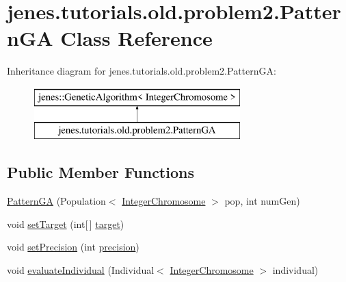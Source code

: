 \hypertarget{classjenes_1_1tutorials_1_1old_1_1problem2_1_1_pattern_g_a}{\section{jenes.\-tutorials.\-old.\-problem2.\-Pattern\-G\-A Class Reference}
\label{classjenes_1_1tutorials_1_1old_1_1problem2_1_1_pattern_g_a}
}
Inheritance diagram for jenes.\-tutorials.\-old.\-problem2.\-Pattern\-G\-A\-:\begin{figure}[H]
\begin{center}
\leavevmode
\includegraphics[height=2.000000cm]{classjenes_1_1tutorials_1_1old_1_1problem2_1_1_pattern_g_a}
\end{center}
\end{figure}
\subsection*{Public Member Functions}
\begin{DoxyCompactItemize}
\item 
\hyperlink{classjenes_1_1tutorials_1_1old_1_1problem2_1_1_pattern_g_a_a6c739b7abe3809978e5a2e8a41788eae}{Pattern\-G\-A} (Population$<$ \hyperlink{classjenes_1_1chromosome_1_1_integer_chromosome}{Integer\-Chromosome} $>$ pop, int num\-Gen)
\item 
void \hyperlink{classjenes_1_1tutorials_1_1old_1_1problem2_1_1_pattern_g_a_acad7ad7941fbcf7fc8d555d0218886e1}{set\-Target} (int\mbox{[}$\,$\mbox{]} \hyperlink{classjenes_1_1tutorials_1_1old_1_1problem2_1_1_pattern_g_a_a56ecbd12f7e7af3887699cc99be1fd24}{target})
\item 
void \hyperlink{classjenes_1_1tutorials_1_1old_1_1problem2_1_1_pattern_g_a_a7d2561b481b6d1f87e6a5c8f602510b0}{set\-Precision} (int \hyperlink{classjenes_1_1tutorials_1_1old_1_1problem2_1_1_pattern_g_a_a66b0ced66757ac14afd2648465ba253f}{precision})
\item 
void \hyperlink{classjenes_1_1tutorials_1_1old_1_1problem2_1_1_pattern_g_a_a90edfd135e58f9a43e3722d9e1df6f95}{evaluate\-Individual} (Individual$<$ \hyperlink{classjenes_1_1chromosome_1_1_integer_chromosome}{Integer\-Chromosome} $>$ individual)
\end{DoxyCompactItemize}

